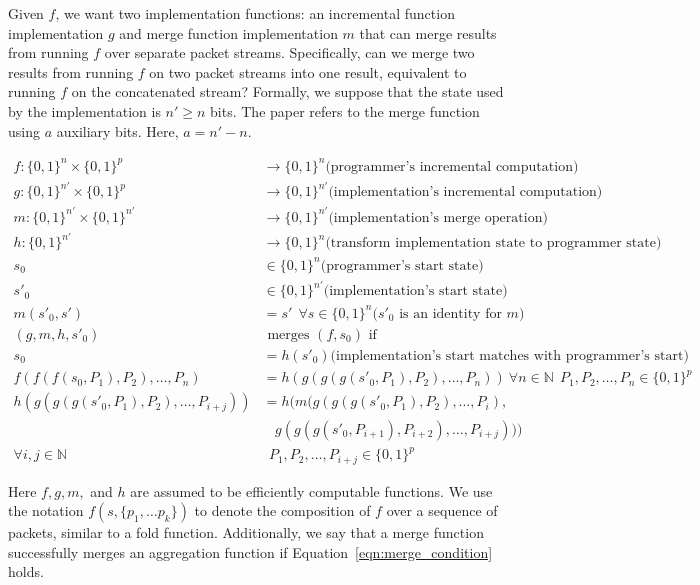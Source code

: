 Given $f$, we want two implementation functions: an incremental function implementation $g$
 and merge function implementation $m$ that can merge results from
running $f$ over separate packet streams. Specifically, can we merge
two results from running $f$ on two packet streams into one result,
equivalent to running $f$ on the concatenated stream? Formally, we suppose that the state used by
the implementation is $n' \geq n$ bits. The paper refers to the merge function using $a$ auxiliary bits.
Here, $a = n' - n$. 

\begin{align}
f : \{0, 1\}^n \times \{0, 1\}^p & \rightarrow \{0, 1\}^n \mbox{(programmer's incremental computation)} \nonumber \\
g : \{0, 1\}^{n'} \times \{0, 1\}^p  & \rightarrow \{0, 1\}^{n'} \mbox{(implementation's incremental computation)} \nonumber \\
m : \{0, 1\}^{n'} \times \{0, 1\}^{n'} & \rightarrow \{0, 1\}^{n'} \mbox{(implementation's merge operation)} \nonumber \\
h : \{0, 1\}^{n'}               & \rightarrow \{0, 1\}^n  \mbox{(transform
 implementation state to programmer state)} \nonumber \\
s_0  & \in \{0, 1\}^n \mbox{(programmer's start state)} \nonumber \\
s'_0 & \in \{0, 1\}^{n'} \mbox{(implementation's start state)} \nonumber \\
m(s'_0, s') & = s' \ \ \forall s \in \{0, 1\}^{n} \mbox{($s'_0$ is an identity for $m$)} \nonumber \\
(g, m, h, s'_0) & \mbox { merges } (f, s_0) \mbox{ if} \nonumber \\
s_0 & = h(s'_0) \mbox{(implementation's start matches with programmer's start)} \label{eqn:start_condition} \\
f(f(f(s_0, P_1), P_2), \dots, P_n) & = h(g(g(g(s'_0, P_1), P_2), \dots, P_n)) \ \forall n \in \mathbb{N} \ \ P_1, P_2, \dots, P_n \in \{0, 1\}^p \label{eqn:projection_condition} \\
h(g(g(g(s'_0, P_1), P_2), \dots, P_{i+j})) & =h( m(g(g(g(s'_0, P_1), P_2), \dots, P_{i}), \nonumber \\
&\ \ \ \ g(g(g(s'_0, P_{i+1}), P_{i+2}), \dots, P_{i+j}))) \nonumber \\
\forall i, j \in \mathbb{N} & \ \  P_1, P_2, \dots, P_{i+j} \in \{0, 1\}^p \label{eqn:merge_condition}
\end{align}

Here $f, g, m,$ and $h$ are assumed to be efficiently computable functions. We use the notation $f(s, \{p_1, \ldots p_k\})$ to denote the composition of $f$ over a sequence
of packets, similar to a fold function. Additionally, we say that a merge function successfully merges an aggregation function if Equation~\ref{eqn:merge_condition} holds. 

